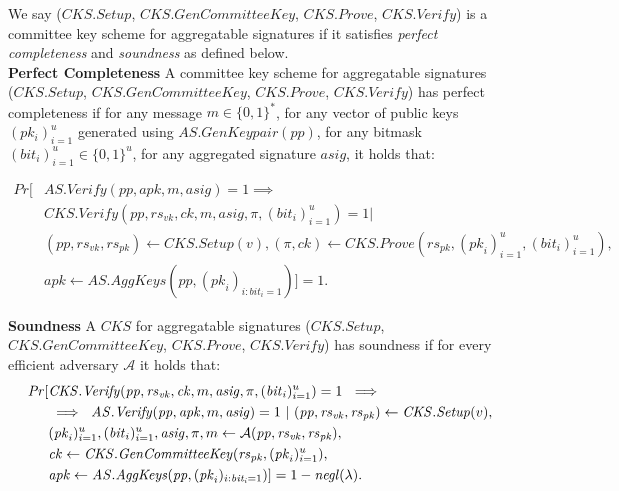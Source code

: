 \begin{definition}
\noindent We say ($\mathit{CKS.Setup}$, $\mathit{CKS.GenCommitteeKey}$, $\mathit{CKS.Prove}$, $\mathit{CKS.Verify}$) 
is a committee key scheme for aggregatable signatures if it satisfies \emph{perfect completeness} and 
\emph{soundness} as defined below. \\

\noindent \textbf{Perfect Completeness} A committee key scheme for aggregatable signatures \\
($\mathit{CKS.Setup}$, $\mathit{CKS.GenCommitteeKey}$, $\mathit{CKS.Prove}$, $\mathit{CKS.Verify}$)
has perfect completeness if for any message $m \in \{0,1\}^*$, 
for any vector of public keys $(\mathit{pk_i})_{i=1}^{u}$ generated using $\mathit{AS.GenKeypair}(\mathit{pp})$, 
for any bitmask $(\mathit{bit_i})_{i=1}^{u} \in \{0,1\}^u$,  for any aggregated signature $\mathit{asig}$, 
it holds that: 

\begin{align*}
\mathit{Pr}[&\mathit{AS.Verify}(\mathit{pp}, \mathit{apk}, m, \mathit{asig}) = 1 \implies  \\
& \mathit{CKS.Verify}(\mathit{pp}, \mathit{rs}_{\mathit{vk}}, \mathit{ck}, m, \mathit{asig}, \pi, (\mathit{bit}_{i})_{i=1}^u) =1 | \\
& (\mathit{pp}, \mathit{rs}_{\mathit{vk}}, \mathit{rs}_{\mathit{pk}}) \leftarrow 
\mathit{CKS.Setup}(v), 
(\pi, \mathit{ck}) \leftarrow \mathit{CKS.Prove}(\mathit{rs}_{\mathit{pk}}, (\mathit{pk}_{i})_{i=1}^u, (\mathit{bit_i})_{i=1}^u), \\
& \mathit{apk} \leftarrow \mathit{AS.AggKeys}(\mathit{pp}, (\mathit{pk}_{i})_{i:\mathit{bit_i}=1})]=1.
\end{align*} 

\noindent \textbf{Soundness} A $\mathit{CKS}$ for aggregatable signatures 
($\mathit{CKS.Setup}$, $\mathit{CKS.GenCommitteeKey}$, $\mathit{CKS.Prove}$, $\mathit{CKS.Verify}$)
has soundness if for every efficient adversary $\mathcal{A}$ it holds that: 
\begin{align*}
\mathit{Pr}[&\mathit{CKS.Verify}(\mathit{pp}, \mathit{rs}_{\mathit{vk}}, \mathit{ck}, m,  \mathit{asig}, \pi, (\mathit{bit}_{i})_{i=1}^u) =1 \
 \implies \\
 &\implies \ \mathit{AS.Verify}(\mathit{pp}, \mathit{apk}, m, \mathit{asig}) = 1  \  |  \ 
 (\mathit{pp}, \mathit{rs}_{\mathit{vk}},\mathit{rs}_{\mathit{pk}}) \leftarrow \mathit{CKS.Setup}(v),\\
& (\mathit{pk}_{i})_{i=1}^u, (\mathit{bit}_{i})_{i=1}^u, \mathit{asig}, \pi, m  \leftarrow \mathcal{A}(\mathit{pp}, \mathit{rs}_{\mathit{vk}}, \mathit{rs}_{\mathit{pk}}), \\
& \mathit{ck} \leftarrow \mathit{CKS.GenCommitteeKey}(\mathit{rs}_{\mathit{pk}}, (\mathit{pk}_{i})_{i=1}^u), \\
& \mathit{apk} \leftarrow \mathit{AS.AggKeys}( \mathit{pp},( \mathit{pk}_{i})_{i:\mathit{bit_i}=1})] = 1 - \negl(\lambda).
\end{align*}
\end{definition}

